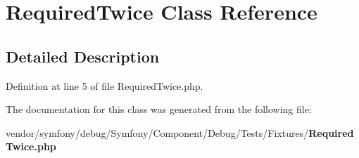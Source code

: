 \section{Required\+Twice Class Reference}
\label{class_symfony_1_1_component_1_1_debug_1_1_tests_1_1_fixtures_1_1_required_twice}


\subsection{Detailed Description}


Definition at line 5 of file Required\+Twice.\+php.



The documentation for this class was generated from the following file\+:\begin{DoxyCompactItemize}
\item 
vendor/symfony/debug/\+Symfony/\+Component/\+Debug/\+Tests/\+Fixtures/{\bf Required\+Twice.\+php}\end{DoxyCompactItemize}
